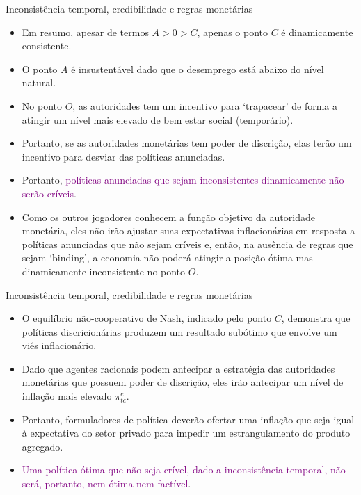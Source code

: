 \documentclass[10pt]{beamer}
\begin{document}
\begin{frame}{Inconsistência temporal, credibilidade e regras monetárias}
    \begin{itemize}
        \item Em resumo, apesar de termos $A > 0 > C$, apenas o ponto $C$ é dinamicamente consistente.
        \bigskip
        \item O ponto $A$ é insustentável dado que o desemprego está abaixo do nível natural.
        \bigskip
        \item No ponto $O$, as autoridades tem um incentivo para `trapacear' de forma a atingir um nível mais elevado de bem estar social (temporário).
        \bigskip
        \item Portanto, se as autoridades monetárias tem poder de discrição, elas terão um incentivo para desviar das políticas anunciadas.
        \bigskip
        \item Portanto, \textcolor{purple}{políticas anunciadas que sejam inconsistentes dinamicamente não serão críveis}.
        \bigskip
        \item Como os outros jogadores conhecem a função objetivo da autoridade monetária, eles não irão ajustar suas expectativas inflacionárias em resposta a políticas anunciadas que não sejam críveis e, então, na ausência de regras que sejam `binding', a economia não poderá atingir a posição ótima mas dinamicamente inconsistente no ponto $O$.
    \end{itemize}
\end{frame}

\begin{frame}{Inconsistência temporal, credibilidade e regras monetárias}
    \begin{itemize}
        \item O equilíbrio não-cooperativo de Nash, indicado pelo ponto $C$, demonstra que políticas discricionárias produzem um resultado subótimo que envolve um viés inflacionário.
        \bigskip
        \item Dado que agentes racionais podem antecipar a estratégia das autoridades monetárias que possuem poder de discrição, eles irão antecipar um nível de inflação mais elevado $\pi_{tc}^e$.
        \bigskip
        \item Portanto, formuladores de política deverão ofertar uma inflação que seja igual à expectativa do setor privado para impedir um estrangulamento do produto agregado.
        \bigskip
        \item \textcolor{purple}{Uma política ótima que não seja crível, dado a inconsistência temporal, não será, portanto, nem ótima nem factível}.
    \end{itemize}
\end{frame}
\end{document}
